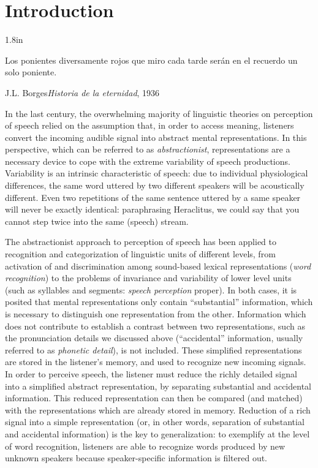 \chapter{Introduction}\label{sec1}
\epigraph{1.8in}{Los ponientes diversamente rojos que miro cada tarde serán en el recuerdo un solo poniente.}{J.L. Borges}{\textit{Historia de la eternidad}, 1936}

In the last century, the overwhelming majority of linguistic theories on perception of speech relied on the assumption that, in order to access meaning, listeners convert the incoming audible signal into abstract mental representations. In this perspective, which can be referred to as \textit{abstractionist}, representations are a necessary device to cope with the extreme variability of speech productions. Variability is an intrinsic characteristic of speech: due to individual physiological differences, the same word uttered by two different speakers will be acoustically different. Even two repetitions of the same sentence uttered by a same speaker will never be exactly identical: paraphrasing Heraclitus, we could say that you cannot step twice into the same (speech) stream. 

The abstractionist approach to perception of speech has been applied to recognition and categorization of linguistic units of different levels, from activation of and discrimination among sound-based lexical representations (\textit{word recognition}) to the problems of invariance and variability of lower level units (such as syllables and segments: \textit{speech perception} proper). In both cases, it is posited that mental representations only contain ``substantial'' information, which is necessary to distinguish one representation from the other. Information which does not contribute to establish a contrast between two representations, such as the pronunciation details we discussed above (``accidental'' information, usually referred to as \textit{phonetic detail}), is not included. These simplified representations are stored in the listener's memory, and used to recognize new incoming signals. In order to perceive speech, the listener must reduce the richly detailed signal into a simplified abstract representation, by separating substantial and accidental information. This reduced representation can then be compared (and matched) with the representations which are already stored in memory. Reduction of a rich signal into a simple representation (or, in other words, separation of substantial and accidental information) is the key to generalization: to exemplify at the level of word recognition, listeners are able to recognize words produced by new unknown speakers because speaker-specific information is filtered out.

